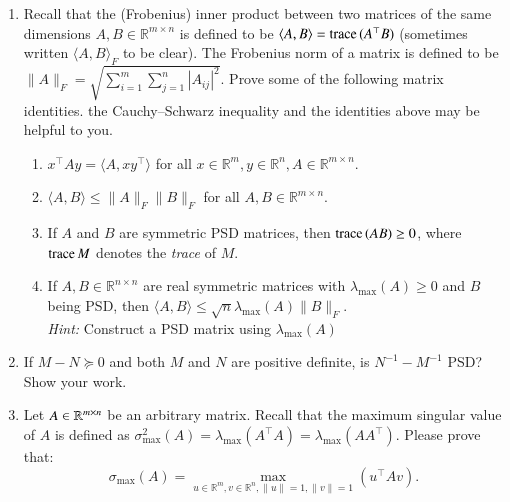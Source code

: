 \documentclass[11pt]{article}
\begin{document}
\begin{enumerate}
    
    \item Recall that the (Frobenius) inner product between two matrices of the same dimensions $A,B \in \mathbb{R}^{m \times n}$ is defined to be $\langle A, B \rangle = \mathrm{trace}\,(A^\top B)$ (sometimes written $\langle A, B \rangle_F$ to be clear). The Frobenius norm of a matrix is defined to be $\|A\|_F = \sqrt{\sum_{i=1}^m \sum_{j=1}^n |A_{ij}|^2}$. Prove some of the following matrix identities. the Cauchy--Schwarz inequality and the identities above may be helpful to you.
    \begin{enumerate}
        \item $x^\top A y = \langle A, x y^\top \rangle$ for all $x \in \mathbb{R}^{m}, y \in \mathbb{R}^{n}, A \in \mathbb{R}^{m \times n}$.
        \item $\langle A, B \rangle \leq \|A\|_F \|B\|_F$ for all $A,B \in \mathbb{R}^{m \times n}$.
        \item If $A$ and $B$ are symmetric PSD matrices, then $\mathrm{trace}\,(AB)\geq 0$, where $\mathrm{trace}\, M$ denotes the {\em trace} of $M$.
        \item If $A,B \in \mathbb{R}^{n \times n}$ are real symmetric matrices with $\lambda_{\max}(A) \geq 0$ and $B$ being PSD, then $\langle A, B \rangle \leq \sqrt n \lambda_{\max}(A) \|B\|_F$. \\
        \emph{Hint:} Construct a PSD matrix using $\lambda_{\max}(A)$
    \end{enumerate}
    
    

    \item If $M-N \succeq 0$ and both $M$ and $N$ are positive definite, is $N^{-1}-M^{-1}$ PSD? Show your work.
    
    
    
    \item Let $A\in\mathbb{R}^{m \times n}$ be an arbitrary matrix. Recall that the maximum singular value of $A$ is defined as $\sigma^2_{\max}(A) = \lambda_{\max}(A^\top A) = \lambda_{\max}(A A^\top)$. Please prove that:
    \[
        \sigma_{\max}(A) = \max_{u \in \mathbb{R}^{m}, v \in \mathbb{R}^n, \|u\|=1,\|v\|=1}(u^\top A v).
    \]
    
    

\end{enumerate}

\newpage
{}
\end{document}
